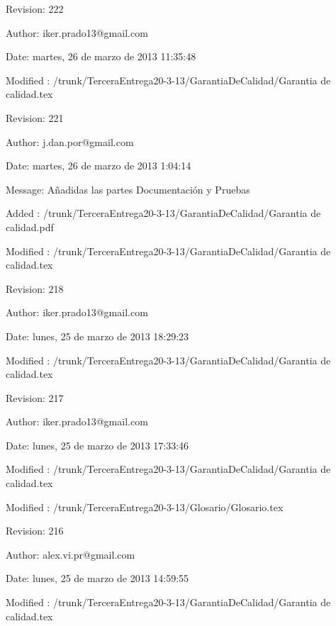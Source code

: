 \documentclass[spanish,a4paper,11pt, twoside]{report}	%
\begin{document}
	\vspace{0.25cm}

	Revision: 222
	
	Author: iker.prado13@gmail.com
	
	Date: martes, 26 de marzo de 2013 11:35:48
	
	Modified : /trunk/TerceraEntrega20-3-13/GarantiaDeCalidad/Garantia de calidad.tex

	\vspace{0.25cm}

	Revision: 221
	
	Author: j.dan.por@gmail.com
	
	Date: martes, 26 de marzo de 2013 1:04:14
	
	Message:	Añadidas las partes Documentación y Pruebas

	Added : /trunk/TerceraEntrega20-3-13/GarantiaDeCalidad/Garantia de calidad.pdf
	
	Modified : /trunk/TerceraEntrega20-3-13/GarantiaDeCalidad/Garantia de calidad.tex

	\vspace{0.25cm}

	Revision: 218
	
	Author: iker.prado13@gmail.com
	
	Date: lunes, 25 de marzo de 2013 18:29:23
	
	Modified : /trunk/TerceraEntrega20-3-13/GarantiaDeCalidad/Garantia de calidad.tex

	\vspace{0.25cm}

	Revision: 217
	
	Author: iker.prado13@gmail.com
	
	Date: lunes, 25 de marzo de 2013 17:33:46
	
	Modified : /trunk/TerceraEntrega20-3-13/GarantiaDeCalidad/Garantia de calidad.tex
	
	Modified : /trunk/TerceraEntrega20-3-13/Glosario/Glosario.tex

	\vspace{0.25cm}

	Revision: 216
	
	Author: alex.vi.pr@gmail.com
	
	Date: lunes, 25 de marzo de 2013 14:59:55
	
	Modified : /trunk/TerceraEntrega20-3-13/GarantiaDeCalidad/Garantia de calidad.tex

	\vspace{0.25cm}
\end{document}
